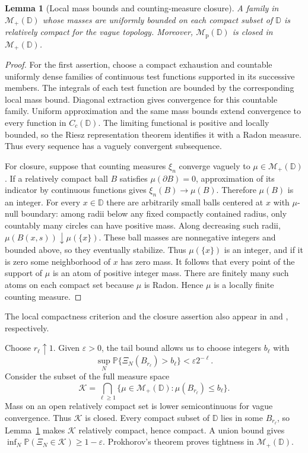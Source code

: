 \documentclass[11pt,a4paper]{article}
\numberwithin{equation}{section}
\newtheorem{lemma}[theorem]{Lemma}
\theoremstyle{remark}
\newcommand{\D}{\mathbb D}
\newcommand{\Prob}{\mathbb P}
\newcommand{\Mplus}{\mathcal M_+}
\newcommand{\Mp}{\mathcal M_{\mathrm p}}
\begin{document}
\begin{lemma}[Local mass bounds and counting-measure closure]
\label{lem:topology}
A family in $\Mplus(\D)$ whose masses are uniformly bounded on
each compact subset of $\D$ is relatively compact for the vague
topology. Moreover, $\Mp(\D)$ is closed in $\Mplus(\D)$.
\end{lemma}
\begin{proof}
For the first assertion, choose a compact exhaustion and countable
uniformly dense families of continuous test functions supported in
its successive members. The integrals of each test function are
bounded by the corresponding local mass bound. Diagonal extraction
gives convergence for this countable family. Uniform approximation
and the same mass bounds extend convergence to every function in
$C_c(\D)$. The limiting functional is positive and locally bounded,
so the Riesz representation theorem identifies it with a Radon
measure. Thus every sequence has a vaguely convergent subsequence.

For closure, suppose that counting measures $\xi_n$ converge vaguely
to $\mu\in\Mplus(\D)$. If a relatively compact ball $B$ satisfies
$\mu(\partial B)=0$, approximation of its indicator by continuous
functions gives $\xi_n(B)\to\mu(B)$. Therefore $\mu(B)$ is an
integer. For every $x\in\D$ there are arbitrarily small balls
centered at $x$ with $\mu$-null boundary: among radii below any fixed
compactly contained radius, only countably many circles can have
positive mass. Along decreasing such radii,
$\mu(B(x,s))\downarrow\mu(\{x\})$.
These ball masses are nonnegative integers and bounded above, so
they eventually stabilize. Thus $\mu(\{x\})$ is an integer, and
if it is zero some neighborhood of $x$ has zero mass.
It follows that every point of the support of $\mu$ is an atom of
positive integer mass. There are finitely many such atoms on each
compact set because $\mu$ is Radon. Hence $\mu$ is a locally finite
counting measure.
\end{proof}
The local compactness criterion and the closure assertion also appear
in \cite[Corollary A2.6.V]{DV1} and \cite[Lemma 9.1.V]{DV2},
respectively.

Choose $r_\ell\uparrow1$. Given $\varepsilon>0$, the tail bound
allows us to choose integers $b_\ell$ with
\[
 \sup_N\Prob\{\Xi_N(B_{r_\ell})>b_\ell\}
 <\varepsilon2^{-\ell}.
\]
Consider the subset of the full measure space
\[
 \mathcal K=\bigcap_{\ell\ge1}
 \{\mu\in\Mplus(\D):\mu(B_{r_\ell})\le b_\ell\}.
\]
Mass on an open relatively compact set is lower semicontinuous
for vague convergence. Thus $\mathcal K$ is closed.
Every compact subset of $\D$ lies in some $B_{r_\ell}$, so
Lemma~\ref{lem:topology} makes $\mathcal K$ relatively compact,
hence compact. A union bound gives
$\inf_N\Prob(\Xi_N\in\mathcal K)\ge1-\varepsilon$.
Prokhorov's theorem proves tightness in $\Mplus(\D)$.
\end{document}
